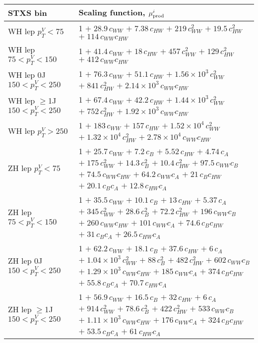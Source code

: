 \begin{tabular}{l|p{}}
    \hline
    STXS bin & Scaling function, $\mu^i_{\rm{prod}}$ \\ \hline
    WH lep $p_{T}^{V} < 75$ & 1 $+\;28.9\,c_{WW}$ $+\;7.38\,c_{HW}$ $+\;219\,c_{WW}^{2}$ $+\;19.5\,c_{HW}^{2}$ $+\;114\,c_{WW}c_{HW}$ \\
    WH lep $75 < p_{T}^{V} < 150$ & 1 $+\;41.4\,c_{WW}$ $+\;18\,c_{HW}$ $+\;457\,c_{WW}^{2}$ $+\;129\,c_{HW}^{2}$ $+\;412\,c_{WW}c_{HW}$ \\
    WH lep 0J $150 < p_{T}^{V} < 250$ & 1 $+\;76.3\,c_{WW}$ $+\;51.1\,c_{HW}$ $+\;1.56\times 10^{3}\,c_{WW}^{2}$ $+\;841\,c_{HW}^{2}$ $+\;2.14\times 10^{3}\,c_{WW}c_{HW}$ \\
    WH lep $\geq$1J $150 < p_{T}^{V} < 250$ & 1 $+\;67.4\,c_{WW}$ $+\;42.2\,c_{HW}$ $+\;1.44\times 10^{3}\,c_{WW}^{2}$ $+\;752\,c_{HW}^{2}$ $+\;1.92\times 10^{3}\,c_{WW}c_{HW}$ \\
    WH lep $p_{T}^{V} > 250$ & 1 $+\;183\,c_{WW}$ $+\;157\,c_{HW}$ $+\;1.52\times 10^{4}\,c_{WW}^{2}$ $+\;1.32\times 10^{4}\,c_{HW}^{2}$ $+\;2.78\times 10^{4}\,c_{WW}c_{HW}$ \\
    \hline
    ZH lep $p_{T}^{V} < 75$ & 1 $+\;25.7\,c_{WW}$ $+\;7.2\,c_{B}$ $+\;5.52\,c_{HW}$ $+\;4.74\,c_{A}$ $+\;175\,c_{WW}^{2}$ $+\;14.3\,c_{B}^{2}$ $+\;10.4\,c_{HW}^{2}$ $+\;97.5\,c_{WW}c_{B}$ $+\;74.5\,c_{WW}c_{HW}$ $+\;64.2\,c_{WW}c_{A}$ $+\;21\,c_{B}c_{HW}$ $+\;20.1\,c_{B}c_{A}$ $+\;12.8\,c_{HW}c_{A}$ \\
    ZH lep $75 < p_{T}^{V} < 150$ & 1 $+\;35.5\,c_{WW}$ $+\;10.1\,c_{B}$ $+\;13\,c_{HW}$ $+\;5.37\,c_{A}$ $+\;345\,c_{WW}^{2}$ $+\;28.6\,c_{B}^{2}$ $+\;72.2\,c_{HW}^{2}$ $+\;196\,c_{WW}c_{B}$ $+\;260\,c_{WW}c_{HW}$ $+\;101\,c_{WW}c_{A}$ $+\;74.6\,c_{B}c_{HW}$ $+\;31\,c_{B}c_{A}$ $+\;26.5\,c_{HW}c_{A}$ \\
    ZH lep 0J $150 < p_{T}^{V} < 250$ & 1 $+\;62.2\,c_{WW}$ $+\;18.1\,c_{B}$ $+\;37.6\,c_{HW}$ $+\;6\,c_{A}$ $+\;1.04\times 10^{3}\,c_{WW}^{2}$ $+\;88\,c_{B}^{2}$ $+\;482\,c_{HW}^{2}$ $+\;602\,c_{WW}c_{B}$ $+\;1.29\times 10^{3}\,c_{WW}c_{HW}$ $+\;185\,c_{WW}c_{A}$ $+\;374\,c_{B}c_{HW}$ $+\;55.8\,c_{B}c_{A}$ $+\;70.7\,c_{HW}c_{A}$ \\
    ZH lep $\geq$1J $150 < p_{T}^{V} < 250$ & 1 $+\;56.9\,c_{WW}$ $+\;16.5\,c_{B}$ $+\;32\,c_{HW}$ $+\;6\,c_{A}$ $+\;914\,c_{WW}^{2}$ $+\;78.6\,c_{B}^{2}$ $+\;422\,c_{HW}^{2}$ $+\;533\,c_{WW}c_{B}$ $+\;1.11\times 10^{3}\,c_{WW}c_{HW}$ $+\;176\,c_{WW}c_{A}$ $+\;324\,c_{B}c_{HW}$ $+\;53.5\,c_{B}c_{A}$ $+\;61\,c_{HW}c_{A}$ \\

\end{tabular}

